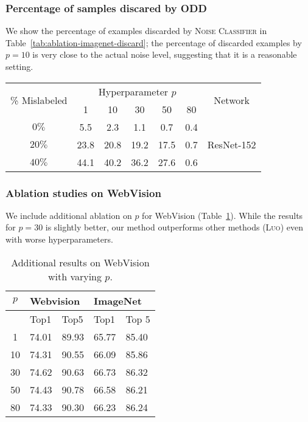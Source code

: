 \documentclass[a4paper,11pt]{article}
\begin{document}
\subsubsection{Percentage of samples discared by \textsc{ODD}} We show the percentage of examples discarded by \textsc{Noise Classifier} in Table~\ref{tab:ablation-imagenet-discard}; the percentage of discarded examples by $p = 10$ is very close to the actual noise level, suggesting that it is a reasonable setting. 

\begin{table*}[htbp]
\begin{center}
\caption{Percentage of example discraded by \textsc{ODD} on ImageNet-2012.}
\label{tab:ablation-imagenet-discard}
\begin{tabular}{c|ccccc|c}
\toprule
\multirow{2}{*}{\% Mislabeled}  & \multicolumn{5}{|c|}{Hyperparameter $p$} & \multirow{2}{*}{Network}
\\
& 1 & 10 & 30 & 50 & 80 & \\\midrule
$0\%$ & 5.5 & 2.3 & 1.1 & 0.7 & 0.4 & \multirow{3}{*}{ResNet-152} \\
$20\%$ & 23.8 & 20.8 & 19.2 & 17.5 & 0.7 &\\
$40\%$ & 44.1 & 40.2 & 36.2 & 27.6 & 0.6  & \\
\bottomrule
\end{tabular}
\end{center}
\end{table*}







\subsubsection{Ablation studies on WebVision} We include additional ablation on $p$ for WebVision (Table~\ref{tab:wv}). While the results for $p = 30$ is slightly better, our method outperforms other methods (\textsc{Luo}) even with worse hyperparameters.

\begin{table}
\centering
\caption{Additional results on WebVision with varying $p$.}
\vspace{1em}
\begin{tabular}{cllll}
\toprule
 $p$ & \multicolumn{2}{l}{Webvision}      & \multicolumn{2}{l}{ImageNet}                 \\ \midrule
                   & Top1      & Top5  & Top1  & Top 5\\\midrule
1               & 74.01     & 89.93 & 65.77    & 85.40        \\
10              & 74.31     & 90.55 & 66.09    & 85.86       \\
30              & 74.62     & 90.63 & 66.73    & 86.32        \\
50              & 74.43     & 90.78 & 66.58    & 86.21        \\
80              & 74.33      & 90.30 & 66.23    & 86.24       \\ \bottomrule
\end{tabular}
\label{tab:wv}
\end{table}
\end{document}
